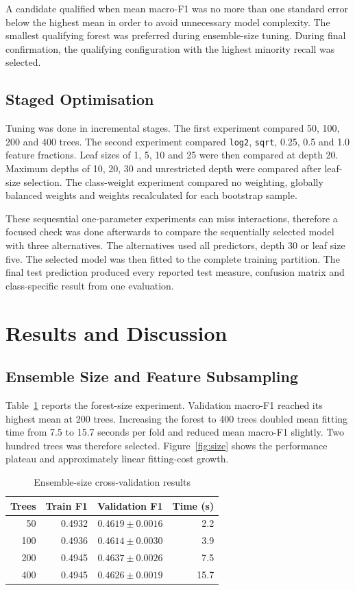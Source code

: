 \documentclass[conference]{IEEEtran}
\begin{document}
A candidate qualified when mean macro-F1 was no more than one standard error below the highest mean in order to avoid unnecessary model complexity. The smallest qualifying forest was preferred during ensemble-size tuning. During final confirmation, the qualifying configuration with the highest minority recall was selected.

\subsection{Staged Optimisation}

Tuning was done in incremental stages. The first experiment compared 50, 100, 200 and 400 trees. The second experiment compared \texttt{log2}, \texttt{sqrt}, 0.25, 0.5 and 1.0 feature fractions. Leaf sizes of 1, 5, 10 and 25 were then compared at depth 20. Maximum depths of 10, 20, 30 and unrestricted depth were compared after leaf-size selection. The class-weight experiment compared no weighting, globally balanced weights and weights recalculated for each bootstrap sample.

These sequesntial one-parameter experiments can miss interactions, therefore a focused check was done afterwards to compare the sequentially selected model with three alternatives. The alternatives used all predictors, depth 30 or leaf size five. The selected model was then fitted to the complete training partition. The final test prediction produced every reported test measure, confusion matrix and class-specific result from one evaluation.

\section{Results and Discussion}

\subsection{Ensemble Size and Feature Subsampling}

Table~\ref{tab:size} reports the forest-size experiment. Validation macro-F1 reached its highest mean at 200 trees. Increasing the forest to 400 trees doubled mean fitting time from 7.5 to 15.7 seconds per fold and reduced mean macro-F1 slightly. Two hundred trees was therefore selected. Figure~\ref{fig:size} shows the performance plateau and approximately linear fitting-cost growth.

\begin{table}[ht]
\centering
\caption{Ensemble-size cross-validation results}
\label{tab:size}
\begin{tabular}{rrrr}
\toprule
Trees & Train F1 & Validation F1 & Time (s)\\
\midrule
50  & 0.4932 & $0.4619\pm0.0016$ & 2.2\\
100 & 0.4936 & $0.4614\pm0.0030$ & 3.9\\
200 & 0.4945 & $0.4637\pm0.0026$ & 7.5\\
400 & 0.4945 & $0.4626\pm0.0019$ & 15.7\\
\bottomrule
\end{tabular}
\end{table}
\end{document}
